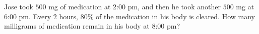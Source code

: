 Jose took $500$ mg of medication at 2:00 pm, and then he took another $500$ mg at 6:00 pm. Every $2$ hours, $80\%$ of the medication in his body is cleared. How many milligrams of medication remain in his body at 8:00 pm?
